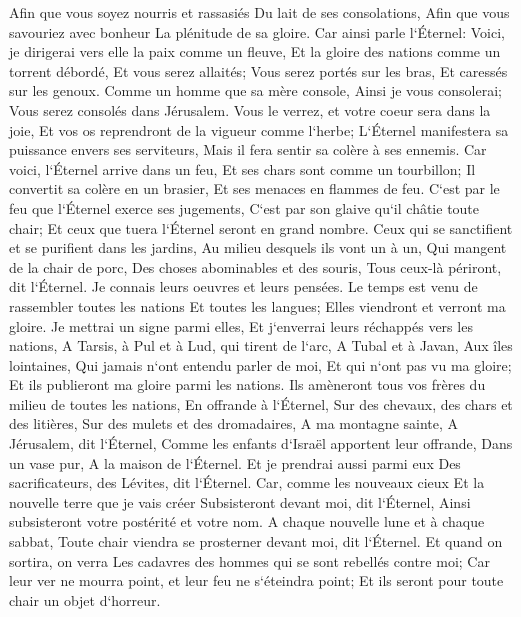 \verse Afin que vous soyez nourris et rassasiés Du lait de ses consolations, Afin que vous savouriez avec bonheur La plénitude de sa gloire. 
\verse Car ainsi parle l`Éternel: Voici, je dirigerai vers elle la paix comme un fleuve, Et la gloire des nations comme un torrent débordé, Et vous serez allaités; Vous serez portés sur les bras, Et caressés sur les genoux. 
\verse Comme un homme que sa mère console, Ainsi je vous consolerai; Vous serez consolés dans Jérusalem. 
\verse Vous le verrez, et votre coeur sera dans la joie, Et vos os reprendront de la vigueur comme l`herbe; L`Éternel manifestera sa puissance envers ses serviteurs, Mais il fera sentir sa colère à ses ennemis. 
\verse Car voici, l`Éternel arrive dans un feu, Et ses chars sont comme un tourbillon; Il convertit sa colère en un brasier, Et ses menaces en flammes de feu. 
\verse C`est par le feu que l`Éternel exerce ses jugements, C`est par son glaive qu`il châtie toute chair; Et ceux que tuera l`Éternel seront en grand nombre. 
\verse Ceux qui se sanctifient et se purifient dans les jardins, Au milieu desquels ils vont un à un, Qui mangent de la chair de porc, Des choses abominables et des souris, Tous ceux-là périront, dit l`Éternel. 
\verse Je connais leurs oeuvres et leurs pensées. Le temps est venu de rassembler toutes les nations Et toutes les langues; Elles viendront et verront ma gloire. 
\verse Je mettrai un signe parmi elles, Et j`enverrai leurs réchappés vers les nations, A Tarsis, à Pul et à Lud, qui tirent de l`arc, A Tubal et à Javan, Aux îles lointaines, Qui jamais n`ont entendu parler de moi, Et qui n`ont pas vu ma gloire; Et ils publieront ma gloire parmi les nations. 
\verse Ils amèneront tous vos frères du milieu de toutes les nations, En offrande à l`Éternel, Sur des chevaux, des chars et des litières, Sur des mulets et des dromadaires, A ma montagne sainte, A Jérusalem, dit l`Éternel, Comme les enfants d`Israël apportent leur offrande, Dans un vase pur, A la maison de l`Éternel. 
\verse Et je prendrai aussi parmi eux Des sacrificateurs, des Lévites, dit l`Éternel. 
\verse Car, comme les nouveaux cieux Et la nouvelle terre que je vais créer Subsisteront devant moi, dit l`Éternel, Ainsi subsisteront votre postérité et votre nom. 
\verse A chaque nouvelle lune et à chaque sabbat, Toute chair viendra se prosterner devant moi, dit l`Éternel. 
\verse Et quand on sortira, on verra Les cadavres des hommes qui se sont rebellés contre moi; Car leur ver ne mourra point, et leur feu ne s`éteindra point; Et ils seront pour toute chair un objet d`horreur. 
